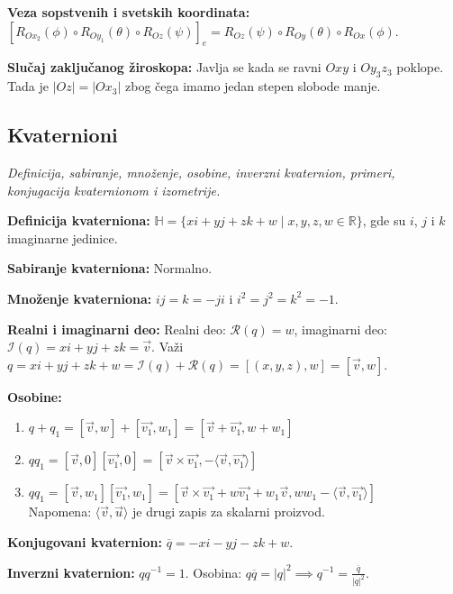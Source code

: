 \documentclass[12pt]{article}
\newcommand{\vek}[1]{\overrightarrow{#1}}
\begin{document}
\textbf{Veza sopstvenih i svetskih koordinata:}
$[R_{Ox_2}(\phi)\circ R_{Oy_1}(\theta)\circ R_{Oz}(\psi)]_e=R_{Oz}(\psi)\circ R_{Oy}(\theta)\circ R_{Ox}(\phi)$.
\par

\textbf{Slučaj zaključanog žiroskopa:} Javlja se kada se ravni
$Oxy$ i $Oy_3z_3$ poklope. Tada je $|Oz|=|Ox_3|$ zbog čega imamo jedan stepen slobode manje.

\subsection{Kvaternioni}
\textit{Definicija, sabiranje, množenje, osobine, inverzni
    kvaternion, primeri, konjugacija kvaternionom i izometrije.}
\par
\vspace*{1cm}

\textbf{Definicija kvaterniona:}
$\mathbb{H}=\{xi+yj+zk+w\mid x,y,z,w\in\mathbb{R}\}$, gde su $i$, $j$ i $k$
imaginarne jedinice.
\par

\textbf{Sabiranje kvaterniona:} Normalno.
\par

\textbf{Množenje kvaterniona:} $i j=k=-j i$ i $i^2=j^2=k^2=-1$.
\par

\textbf{Realni i imaginarni deo:} Realni deo: $\mathcal{R}(q)=w$, imaginarni
deo: $\mathcal{I}(q)=x i +y j +z k=\vek{v}$. Važi
$q=xi+yj+zk+w=\mathcal{I}(q)+\mathcal{R}(q)=[(x,y,z),w]=[\vek{v},w]$.
\par

\textbf{Osobine:}
\begin{enumerate}[label=\textbf{(\arabic*)}]
    \item $q+q_1=[\vek{v},w]+[\vek{v_1},w_1]=[\vek{v}+\vek{v_1},w+w_1]$
    \item $q q_1=[\vek{v},0][\vek{v_1},0]=[\vek{v}\times\vek{v_1},-\langle\vek{v},\vek{v_1}\rangle]$
    \item $q q_1=[\vek{v},w_1][\vek{v_1},w_1]=[\vek{v}\times\vek{v_1}+w \vek{v_1}+w_1\vek{v},w w_1-\langle\vek{v},\vek{v_1}\rangle]$\\
          Napomena: $\langle\vek{v},\vek{u}\rangle$ je drugi zapis za skalarni proizvod.
\end{enumerate}

\textbf{Konjugovani kvaternion:} $\overline{q}=-x i -y j -z k+w$.
\par

\textbf{Inverzni kvaternion:} $q q^{-1}=1$. Osobina:
$q \overline{q}=|q|^2 \implies q^{-1}=\frac{\overline{q}}{|q|^2}$.
\par
\end{document}
